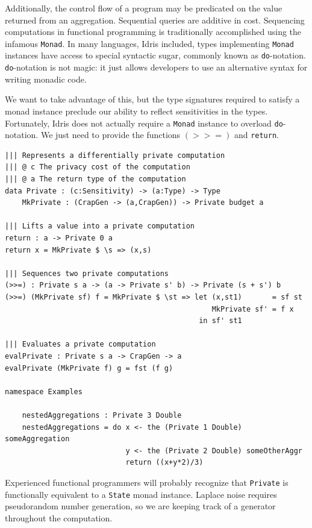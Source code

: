 \documentclass[12pt]{report}
\begin{document}
Additionally, the control flow of a program may be predicated on the value returned from an aggregation.
Sequential queries are additive in cost.
Sequencing computations in functional programming is traditionally accomplished using the infamous \texttt{Monad}.
In many languages, Idris included, types implementing \texttt{Monad} instances have access to special syntactic sugar, commonly known as \texttt{do}-notation.
\texttt{do}-notation is not magic: it just allows developers to use an alternative syntax for writing monadic code.

We want to take advantage of this, but the type signatures required to satisfy a monad instance preclude our ability to reflect sensitivities in the types.
Fortunately, Idris does not actually require a \texttt{Monad} instance to overload \texttt{do}-notation.
We just need to provide the functions \texttt{$(>>=)$} and \texttt{return}.

\begin{lstlisting}[caption={Representing differentially private mechanisms},label={lst:mechanisms}]
||| Represents a differentially private computation
||| @ c The privacy cost of the computation
||| @ a The return type of the computation
data Private : (c:Sensitivity) -> (a:Type) -> Type
    MkPrivate : (CrapGen -> (a,CrapGen)) -> Private budget a

||| Lifts a value into a private computation
return : a -> Private 0 a
return x = MkPrivate $ \s => (x,s)

||| Sequences two private computations
(>>=) : Private s a -> (a -> Private s' b) -> Private (s + s') b
(>>=) (MkPrivate sf) f = MkPrivate $ \st => let (x,st1)       = sf st
                                                MkPrivate sf' = f x
                                             in sf' st1

||| Evaluates a private computation
evalPrivate : Private s a -> CrapGen -> a
evalPrivate (MkPrivate f) g = fst (f g)

namespace Examples

    nestedAggregations : Private 3 Double
    nestedAggregations = do x <- the (Private 1 Double) someAggregation
                            y <- the (Private 2 Double) someOtherAggr
                            return ((x+y*2)/3)
\end{lstlisting}

Experienced functional programmers will probably recognize that \texttt{Private} is functionally equivalent to a \texttt{State} monad instance.
Laplace noise requires pseudorandom number generation, so we are keeping track of a generator throughout the computation.
\end{document}
